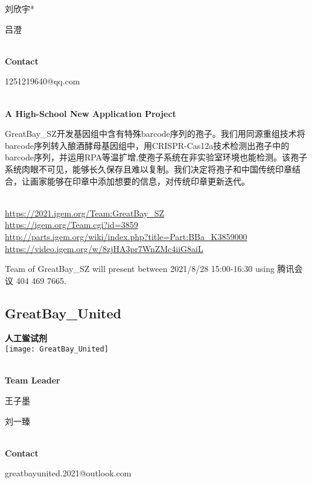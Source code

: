   刘欣宇*

  吕澄


\textbf{\\Contact}

  1251219640@qq.com


\textbf{\\A High-School New Application Project\\}\begin{spacing}{1.5}

GreatBay\_SZ开发基因组中含有特殊barcode序列的孢子。我们用同源重组技术将barcode序列转入酿酒酵母基因组中，用CRISPR-Cas12a技术检测出孢子中的barcode序列，并运用RPA等温扩增,使孢子系统在非实验室环境也能检测。该孢子系统肉眼不可见，能够长久保存且难以复制。我们决定将孢子和中国传统印章结合，让画家能够在印章中添加想要的信息，对传统印章更新迭代。\end{spacing}
\\

\url{https://2021.igem.org/Team:GreatBay\_SZ }\\
\url{https://igem.org/Team.cgi?id=3859 }\\
\url{http://parts.igem.org/wiki/index.php?title=Part:BBa_K3859000 }\\
\url{https://video.igem.org/w/8zjHA3pr7WnZMc4iiG8aiL }\\

\vfill{}









Team of GreatBay\_SZ will present between       2021/8/28 15:00-16:30  using 腾讯会议 404 469 7665.
\newpage


\subsection{\textcolor{Blu}{ GreatBay\_United } }
\vspace{5mm}
\begin{center}
\large{
  \textbf{ 人工鲎试剂 }\\
  \texttt{[image: GreatBay\_United]}
}
\end{center}
\textbf{\\Team Leader}

  王子墨

  刘一臻


\textbf{\\Contact}

  greatbayunited.2021@outlook.com


